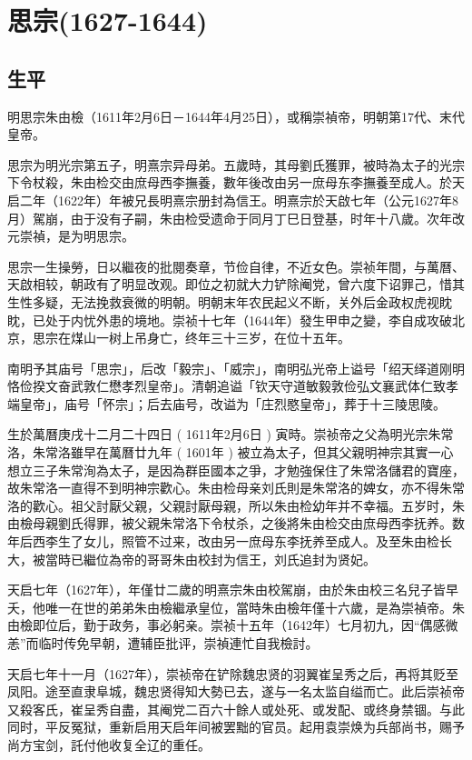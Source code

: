 
\section{思宗\tiny(1627-1644)}

\subsection{生平}

明思宗朱由檢（1611年2月6日－1644年4月25日），或稱崇禎帝，明朝第17代、末代皇帝。

思宗为明光宗第五子，明熹宗异母弟。五歲時，其母劉氏獲罪，被時為太子的光宗下令杖殺，朱由检交由庶母西李撫養，數年後改由另一庶母东李撫養至成人。於天启二年（1622年）年被兄長明熹宗册封為信王。明熹宗於天啟七年（公元1627年8月）駕崩，由于没有子嗣，朱由检受遗命于同月丁巳日登基，时年十八歲。次年改元崇禎，是为明思宗。

思宗一生操勞，日以繼夜的批閱奏章，节俭自律，不近女色。崇祯年間，与萬曆、天啟相较，朝政有了明显改观。即位之初就大力铲除阉党，曾六度下诏罪己，惜其生性多疑，无法挽救衰微的明朝。明朝末年农民起义不断，关外后金政权虎视眈眈，已处于内忧外患的境地。崇祯十七年（1644年）發生甲申之變，李自成攻破北京，思宗在煤山一树上吊身亡，终年三十三岁，在位十五年。

南明予其庙号「思宗」，后改「毅宗」、「威宗」，南明弘光帝上谥号「绍天绎道刚明恪俭揆文奋武敦仁懋孝烈皇帝」。清朝追谥「钦天守道敏毅敦俭弘文襄武体仁致孝端皇帝」，庙号「怀宗」；后去庙号，改谥为「庄烈愍皇帝」，葬于十三陵思陵。

生於萬曆庚戌十二月二十四日 ( 1611年2月6日 ) 寅時。崇祯帝之父為明光宗朱常洛，朱常洛雖早在萬曆廿九年 ( 1601年 ) 被立為太子，但其父親明神宗其實一心想立三子朱常洵為太子，是因為群臣國本之爭，才勉強保住了朱常洛儲君的寶座，故朱常洛一直得不到明神宗歡心。朱由检母亲刘氏則是朱常洛的婢女，亦不得朱常洛的歡心。祖父討厭父親，父親討厭母親，所以朱由检幼年并不幸福。五岁时，朱由檢母親劉氏得罪，被父親朱常洛下令杖杀，之後將朱由检交由庶母西李抚养。数年后西李生了女儿，照管不过来，改由另一庶母东李抚养至成人。及至朱由检长大，被當時已繼位為帝的哥哥朱由校封为信王，刘氏追封为贤妃。

天启七年（1627年），年僅廿二歲的明熹宗朱由校駕崩，由於朱由校三名兒子皆早夭，他唯一在世的弟弟朱由檢繼承皇位，當時朱由檢年僅十六歲，是為崇禎帝。朱由檢即位后，勤于政务，事必躬亲。崇祯十五年（1642年）七月初九，因“偶感微恙”而临时传免早朝，遭辅臣批评，崇禎連忙自我檢討。

天启七年十一月（1627年），崇祯帝在铲除魏忠贤的羽翼崔呈秀之后，再将其贬至凤阳。途至直隶阜城，魏忠贤得知大勢已去，遂与一名太监自缢而亡。此后崇祯帝又殺客氏，崔呈秀自盡，其阉党二百六十餘人或处死、或发配、或终身禁锢。与此同时，平反冤狱，重新启用天启年间被罢黜的官员。起用袁崇焕为兵部尚书，赐予尚方宝剑，託付他收复全辽的重任。

